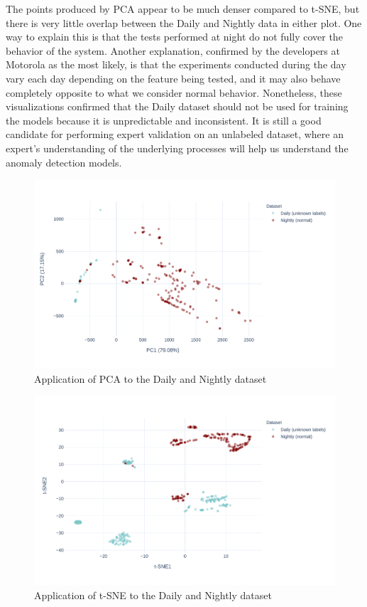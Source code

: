 The points produced by PCA appear to be much denser compared to t-SNE, but there is very little overlap between the Daily and Nightly data in either plot. One way to explain this is that the tests performed at night do not fully cover the behavior of the system. Another explanation, confirmed by the developers at Motorola as the most likely, is that the experiments conducted during the day vary each day depending on the feature being tested, and it may also behave completely opposite to what we consider normal behavior. Nonetheless, these visualizations confirmed that the Daily dataset should not be used for training the models because it is unpredictable and inconsistent. It is still a good candidate for performing expert validation on an unlabeled dataset, where an expert's understanding of the underlying processes will help us understand the anomaly detection models.

\begin{figure}[h]
    \centering
    \includegraphics[width=\textwidth]{img/pca-nightly-daily.pdf}
    \caption{Application of PCA to the Daily and Nightly dataset}
    \label{fig:pca-nightly-daily}
\end{figure}

\begin{figure}[h]
    \centering
    \includegraphics[width=\textwidth]{img/tsne-nightly-daily.pdf}
    \caption{Application of t-SNE to the Daily and Nightly dataset}
    \label{fig:tsne-nightly-daily}
\end{figure}

